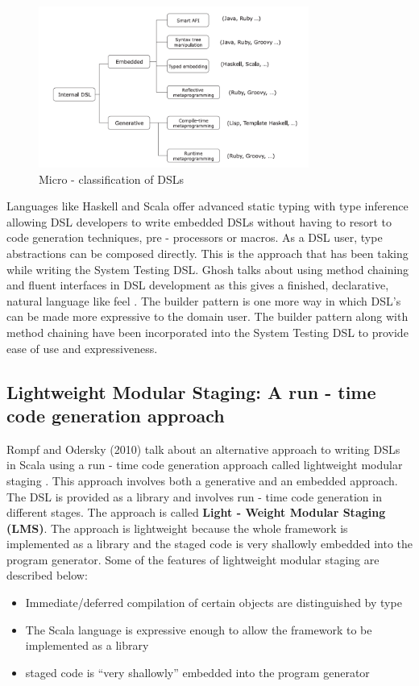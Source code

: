 \documentclass[12 pt]{article}
\begin{document}
\begin{figure}[h!]
  \centering
    \includegraphics[height=200px]{figures/classification.png}
  \caption{Micro - classification of DSLs}
\end{figure}

\noindent
Languages like Haskell and Scala offer advanced static typing with type inference allowing DSL developers to write embedded DSLs without having to resort to code generation techniques, pre - processors or macros. As a DSL user, type abstractions can be composed directly. This is the approach that has been taking while writing the System Testing DSL. Ghosh talks about using method chaining and fluent interfaces in DSL development as this gives a finished, declarative, natural language like feel \cite{fluentInterface}. The builder pattern is one more way in which DSL's can be made more expressive to the domain user. The builder pattern along with method chaining have been incorporated into the System Testing DSL to provide ease of use and expressiveness.

\subsection{Lightweight Modular Staging: A run - time code generation approach}
Rompf and Odersky (2010) talk about an alternative approach to writing DSLs in Scala using a run - time code generation approach called lightweight modular staging \cite{lms}. This approach involves both a generative and an embedded approach. The DSL is provided as a library and involves run - time code generation in different stages. The approach is called \textbf{Light - Weight Modular Staging (LMS)}. The approach is lightweight because the whole framework is implemented as a library and the staged code is very shallowly embedded into the program generator. Some of the features of lightweight modular staging are described below:
\begin{itemize}
\item Immediate/deferred compilation of certain objects are distinguished by type
\item The Scala language is expressive enough to allow the framework to be implemented as a library
\item staged code is “very shallowly” embedded into the program generator
\end{itemize}
\bigskip
\end{document}
